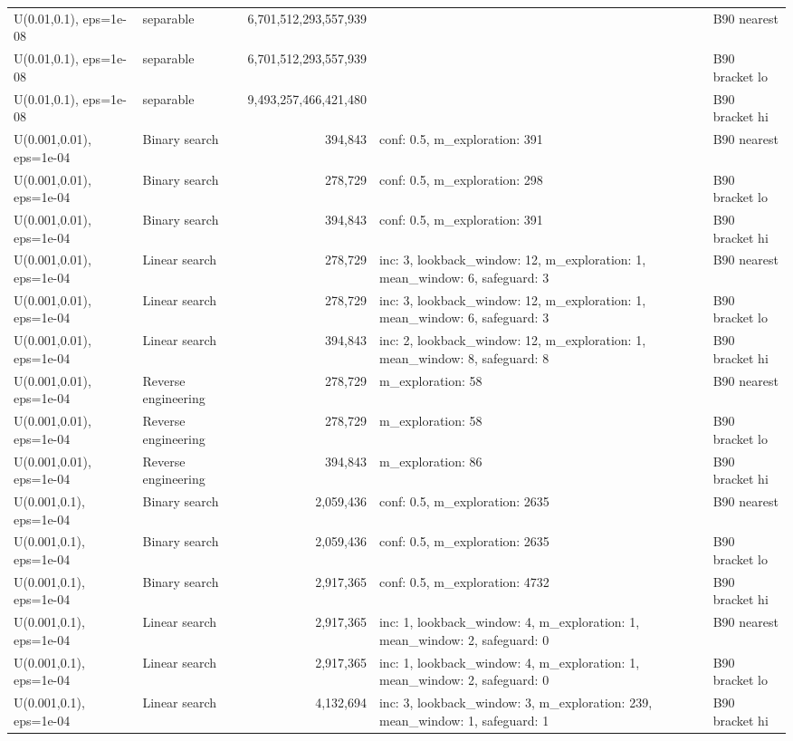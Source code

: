 \begin{tabular}{llrll}
U(0.01,0.1), eps=1e-08 & separable & 6,701,512,293,557,939 &  & B90 nearest \\
U(0.01,0.1), eps=1e-08 & separable & 6,701,512,293,557,939 &  & B90 bracket lo \\
U(0.01,0.1), eps=1e-08 & separable & 9,493,257,466,421,480 &  & B90 bracket hi \\
U(0.001,0.01), eps=1e-04 & Binary search & 394,843 & conf: 0.5, m\_exploration: 391 & B90 nearest \\
U(0.001,0.01), eps=1e-04 & Binary search & 278,729 & conf: 0.5, m\_exploration: 298 & B90 bracket lo \\
U(0.001,0.01), eps=1e-04 & Binary search & 394,843 & conf: 0.5, m\_exploration: 391 & B90 bracket hi \\
U(0.001,0.01), eps=1e-04 & Linear search & 278,729 & inc: 3, lookback\_window: 12, m\_exploration: 1, mean\_window: 6, safeguard: 3 & B90 nearest \\
U(0.001,0.01), eps=1e-04 & Linear search & 278,729 & inc: 3, lookback\_window: 12, m\_exploration: 1, mean\_window: 6, safeguard: 3 & B90 bracket lo \\
U(0.001,0.01), eps=1e-04 & Linear search & 394,843 & inc: 2, lookback\_window: 12, m\_exploration: 1, mean\_window: 8, safeguard: 8 & B90 bracket hi \\
U(0.001,0.01), eps=1e-04 & Reverse engineering & 278,729 & m\_exploration: 58 & B90 nearest \\
U(0.001,0.01), eps=1e-04 & Reverse engineering & 278,729 & m\_exploration: 58 & B90 bracket lo \\
U(0.001,0.01), eps=1e-04 & Reverse engineering & 394,843 & m\_exploration: 86 & B90 bracket hi \\
U(0.001,0.1), eps=1e-04 & Binary search & 2,059,436 & conf: 0.5, m\_exploration: 2635 & B90 nearest \\
U(0.001,0.1), eps=1e-04 & Binary search & 2,059,436 & conf: 0.5, m\_exploration: 2635 & B90 bracket lo \\
U(0.001,0.1), eps=1e-04 & Binary search & 2,917,365 & conf: 0.5, m\_exploration: 4732 & B90 bracket hi \\
U(0.001,0.1), eps=1e-04 & Linear search & 2,917,365 & inc: 1, lookback\_window: 4, m\_exploration: 1, mean\_window: 2, safeguard: 0 & B90 nearest \\
U(0.001,0.1), eps=1e-04 & Linear search & 2,917,365 & inc: 1, lookback\_window: 4, m\_exploration: 1, mean\_window: 2, safeguard: 0 & B90 bracket lo \\
U(0.001,0.1), eps=1e-04 & Linear search & 4,132,694 & inc: 3, lookback\_window: 3, m\_exploration: 239, mean\_window: 1, safeguard: 1 & B90 bracket hi \\

\end{tabular}
